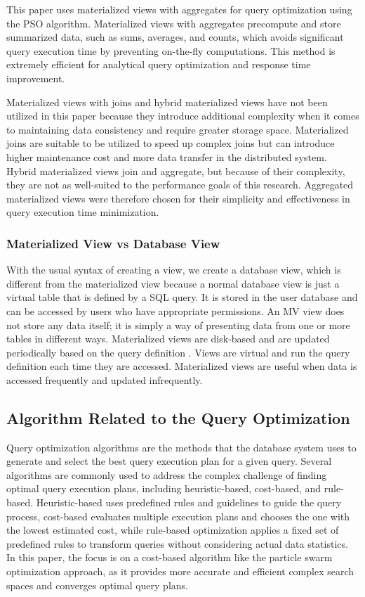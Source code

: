 This paper uses materialized views with aggregates for query optimization using the PSO algorithm. Materialized views with aggregates precompute and store summarized data, such as sums, averages, and counts, which avoids significant query execution time by preventing on-the-fly computations. This method is extremely efficient for analytical query optimization and response time improvement.

Materialized views with joins and hybrid materialized views have not been utilized in this paper because they introduce additional complexity when it comes to maintaining data consistency and require greater storage space. Materialized joins are suitable to be utilized to speed up complex joins but can introduce higher maintenance cost and more data transfer in the distributed system. Hybrid materialized views join and aggregate, but because of their complexity, they are not as well-suited to the performance goals of this research. Aggregated materialized views were therefore chosen for their simplicity and effectiveness in query execution time minimization.

\subsubsection{Materialized View vs Database View} With the usual syntax of creating a view, we create a database view, which is different from the materialized view because a normal database view is just a virtual table that is defined by a SQL query. It is stored in the user database and can be accessed by users who have appropriate permissions. An MV view does not store any data itself; it is simply a way of presenting data from one or more tables in different ways. Materialized views are disk-based and are updated periodically based on the query definition \cite{Stackoverflow-author-08-2008}. Views are virtual and run the query definition each time they are accessed. Materialized views are useful when data is accessed frequently and updated infrequently.

\subsection{Algorithm Related to the Query Optimization }
Query optimization algorithms are the methods that the database system uses to generate and select the best query execution plan for a given query. Several algorithms are commonly used to address the complex challenge of finding optimal query execution plans, including heuristic-based, cost-based, and rule-based. Heuristic-based uses predefined rules and guidelines to guide the query process, cost-based evaluates multiple execution plans and chooses the one with the lowest estimated cost, while rule-based optimization applies a fixed set of predefined rules to transform queries without considering actual data statistics. In this paper, the focus is on a cost-based algorithm like the particle swarm optimization approach, as it provides more accurate and efficient complex search spaces and converges optimal query plans.

